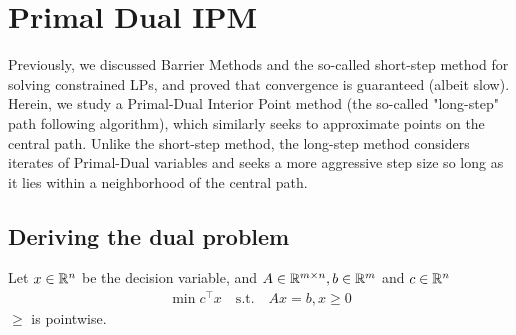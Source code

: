 \section{Primal Dual IPM}
Previously, we discussed Barrier Methods and the so-called short-step method for solving constrained LPs, and proved that convergence is guaranteed (albeit slow). Herein, we study a Primal-Dual Interior Point method (the so-called "long-step"  path following algorithm), which similarly seeks to approximate points on the central path. Unlike the short-step method, the long-step method considers iterates of Primal-Dual variables and seeks a more aggressive step size so long as it lies within a neighborhood of the central path.



\subsection{Deriving the dual problem}

Let $x \in \mathbb{R}^n$ be the decision variable, and $A \in \mathbb{R}^{m \times n},b \in \mathbb{R}^m$ and $c \in \mathbb{R}^n$
\begin{eqnarray}
\min c^\top x \quad \text{s.t.}\quad Ax = b, x \ge 0 
\end{eqnarray}
$\ge$ is pointwise.

